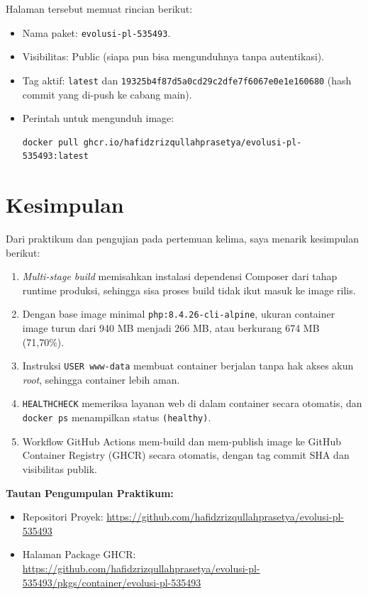 \documentclass[a4paper,oneside,12pt]{report}
\begin{document}
Halaman tersebut memuat rincian berikut:
\begin{itemize}
    \item Nama paket: \texttt{evolusi-pl-535493}.
    \item Visibilitas: Public (siapa pun bisa mengunduhnya tanpa autentikasi).
    \item Tag aktif: \texttt{latest} dan \texttt{19325b4f87d5a0cd29c2dfe7f6067e0e1e160680} (hash commit yang di-push ke cabang main).
    \item Perintah untuk mengunduh image:
    \begin{lstlisting}[style=bashstyle]
docker pull ghcr.io/hafidzrizqullahprasetya/evolusi-pl-535493:latest
    \end{lstlisting}
\end{itemize}

\clearpage

\chapter{Kesimpulan}
Dari praktikum dan pengujian pada pertemuan kelima, saya menarik kesimpulan berikut:
\begin{enumerate}
    \item \textit{Multi-stage build} memisahkan instalasi dependensi Composer dari tahap runtime produksi, sehingga sisa proses build tidak ikut masuk ke image rilis.
    \item Dengan base image minimal \texttt{php:8.4.26-cli-alpine}, ukuran container image turun dari 940 MB menjadi 266 MB, atau berkurang 674 MB (71,70\%).
    \item Instruksi \texttt{USER www-data} membuat container berjalan tanpa hak akses akun \textit{root}, sehingga container lebih aman.
    \item \texttt{HEALTHCHECK} memeriksa layanan web di dalam container secara otomatis, dan \texttt{docker ps} menampilkan status \texttt{(healthy)}.
    \item Workflow GitHub Actions mem-build dan mem-publish image ke GitHub Container Registry (GHCR) secara otomatis, dengan tag commit SHA dan visibilitas publik.
\end{enumerate}

\vspace{0.8cm}
\noindent\textbf{Tautan Pengumpulan Praktikum:}
\begin{itemize}
    \item Repositori Proyek: \url{https://github.com/hafidzrizqullahprasetya/evolusi-pl-535493}
    \item Halaman Package GHCR: \url{https://github.com/hafidzrizqullahprasetya/evolusi-pl-535493/pkgs/container/evolusi-pl-535493}
\end{itemize}
\end{document}

